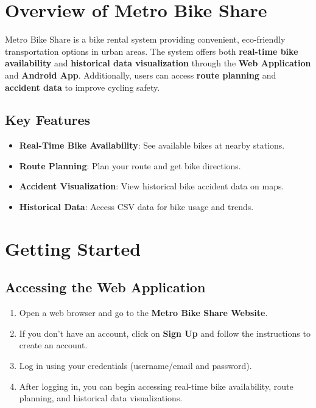 \documentclass[12pt]{article}
\begin{document}
\section{Overview of Metro Bike Share}
Metro Bike Share is a bike rental system providing convenient, eco-friendly transportation options in urban areas. The system offers both \textbf{real-time bike availability} and \textbf{historical data visualization} through the \textbf{Web Application} and \textbf{Android App}. Additionally, users can access \textbf{route planning} and \textbf{accident data} to improve cycling safety.

\subsection*{Key Features}
\begin{itemize}
    \item \textbf{Real-Time Bike Availability}: See available bikes at nearby stations.
    \item \textbf{Route Planning}: Plan your route and get bike directions.
    \item \textbf{Accident Visualization}: View historical bike accident data on maps.
    \item \textbf{Historical Data}: Access CSV data for bike usage and trends.
\end{itemize}

\section{Getting Started}
\subsection{Accessing the Web Application}
\begin{enumerate}
    \item Open a web browser and go to the \textbf{Metro Bike Share Website}.
    \item If you don’t have an account, click on \textbf{Sign Up} and follow the instructions to create an account.
    \item Log in using your credentials (username/email and password).
    \item After logging in, you can begin accessing real-time bike availability, route planning, and historical data visualizations.
\end{enumerate}
\end{document}
